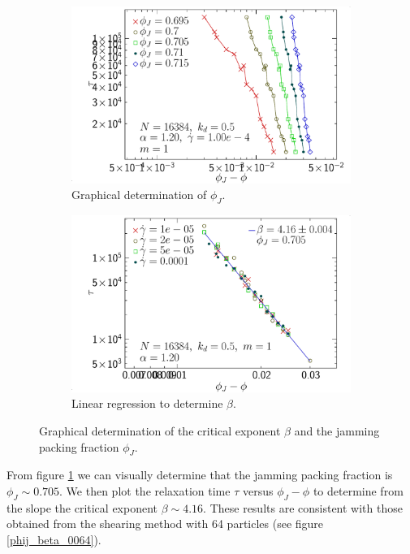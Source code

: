 \documentclass[class=report, float=false, crop=false]{standalone}
\begin{document}
\begin{figure}[h!]
\centering
    \begin{subfigure}[t]{0.49\textwidth}
        \centering
        \includegraphics[width=\textwidth]{figures/figs/tau_dphi_16384_GDh100_EL120}
        \caption{Graphical determination of $\phi_J$.}
        \label{tau_dphi_16384_GDh100_EL120}
    \end{subfigure}
    \hfill
    \begin{subfigure}[t]{0.49\textwidth}
        \centering
        \includegraphics[width=\textwidth]{figures/figs/tau_dphi_16384_PJ70500_EL120}
        \caption{Linear regression to determine $\beta$.}
        \label{tau_dphi_16384_PJ70500_EL120}
    \end{subfigure}
    \caption{Graphical determination of the critical exponent $\beta$ and the jamming packing fraction $\phi_J$.}
    \label{tau_dphi}
\end{figure}

From figure \ref{tau_dphi_16384_GDh100_EL120} we can visually determine that the jamming packing fraction is $\phi_J\sim0.705$. We then plot the relaxation time $\tau$ versus $\phi_J-\phi$ to determine from the slope the critical exponent $\beta\sim4.16$. These results are consistent with those obtained from the shearing method with 64 particles (see figure \ref{phij_beta_0064}).\\
\end{document}
